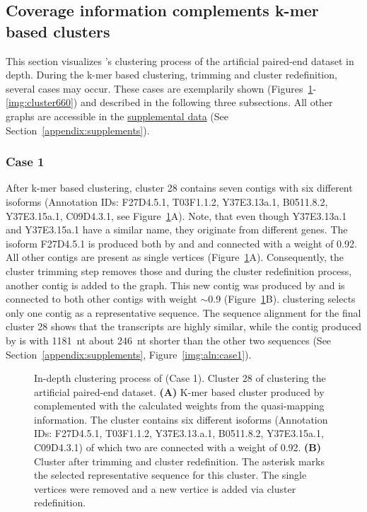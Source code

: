 \documentclass[12pt,a4paper,english]{article}
\begin{document}
	\subsection{Coverage information complements k-mer based clusters}
	\label{ssec:graphs}
	This section visualizes \karma{}'s clustering process of the artificial paired-end \celegans dataset in depth. During the k-mer based clustering, trimming and cluster redefinition, several cases may occur. These cases are exemplarily shown (Figures~\ref{img:cluster28}-\ref{img:cluster660}) and described in the following three subsections. All other graphs are accessible in the \href{https://github.com/lmfaber/master_thesis/tree/master/supplemental_data/graphs}{supplemental data} (See Section~\ref{appendix:supplements}).
	
	\subsubsection*{Case 1}
        After k-mer based clustering, cluster 28 contains seven contigs with six different isoforms (Annotation IDs: F27D4.5.1, T03F1.1.2, Y37E3.13a.1, B0511.8.2, Y37E3.15a.1, C09D4.3.1, see Figure~\ref{img:cluster28}A). 
        Note, that even though Y37E3.13a.1 and Y37E3.15a.1 have a similar name, they originate from different genes. The isoform F27D4.5.1 is produced both by \spades and \trinity and connected with a weight of 0.92. All other contigs are present as single vertices (Figure~\ref{img:cluster28}A). Consequently, the cluster trimming step removes those and during the cluster redefinition process, another contig is added to the graph. This new contig was produced by \soap and is connected to both other contigs with weight $\sim$0.9 (Figure~\ref{img:cluster28}B). \mcl clustering selects only one contig as a representative sequence. 
        The sequence alignment for the final cluster 28 shows that the transcripts are highly similar, while the contig produced by \soap is with 1181~nt about 246~nt shorter than the other two sequences (See Section~\ref{appendix:supplements}, Figure~\ref{img:aln:case1}).

		\begin{figure}[H]
			\centering
			\def\svgwidth{\textwidth}
			
			\caption[In-depth clustering process of \karma (Case 1).]{In-depth clustering process of \karma (Case 1). Cluster 28 of clustering the artificial paired-end dataset. \textbf{(A)} K-mer based cluster produced by \hdbscan complemented with the calculated weights from the quasi-mapping information. The cluster contains six different isoforms (Annotation IDs: F27D4.5.1, T03F1.1.2, Y37E3.13.a.1, B0511.8.2, Y37E3.15a.1, C09D4.3.1) of which two are connected with a weight of 0.92. \textbf{(B)} Cluster after trimming and cluster redefinition. The asterisk marks the selected representative sequence for this cluster. The single vertices were removed and a new vertice is added via cluster redefinition.}
			\label{img:cluster28}
		\end{figure}
		
\end{document}
